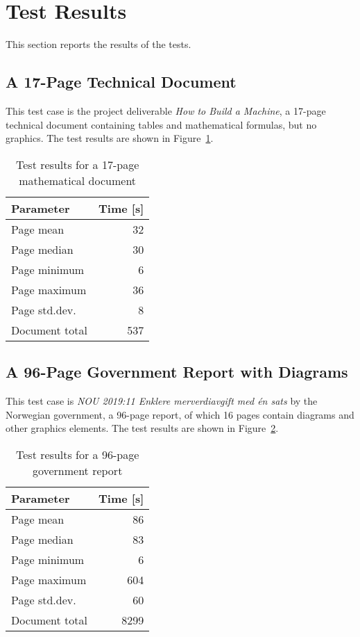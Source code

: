 \documentclass[a4paper,11pt]{article}
\begin{document}
\section{Test Results}

This section reports the results of the tests.

\subsection{A 17-Page Technical Document}

This test case is the project deliverable \emph{How to Build a Machine}, a 17-page technical document containing tables and mathematical formulas, but no graphics.
The test results are shown in Figure~\ref{tab:17-page-doc}.

\begin{table}[htbp]
  \centering\small
  \begin{tabular}{@{}lr@{}}
    \hline
    Parameter      & Time [s] \\
    \hline
    Page mean      & 32  \\
    Page median    & 30  \\
    Page minimum   & 6   \\
    Page maximum   & 36  \\
    Page std.dev.  & 8   \\
    Document total & 537 \\
    \hline
  \end{tabular}
  \caption{Test results for a 17-page mathematical document}
  \label{tab:17-page-doc}
\end{table}

\subsection{A 96-Page Government Report with Diagrams}

This test case is \emph{NOU 2019:11 Enklere merverdiavgift med én sats} by the Norwegian government, a 96-page report, of which 16 pages contain diagrams and other graphics elements.
The test results are shown in Figure~\ref{tab:96-page-doc}.

\begin{table}[htbp]
  \centering\small
  \begin{tabular}{@{}lr@{}}
    \hline
    Parameter      & Time [s] \\
    \hline
    Page mean      & 86   \\
    Page median    & 83   \\
    Page minimum   & 6    \\
    Page maximum   & 604  \\
    Page std.dev.  & 60   \\
    Document total & 8299 \\
    \hline
  \end{tabular}
  \caption{Test results for a 96-page government report}
  \label{tab:96-page-doc}
\end{table}
\end{document}
